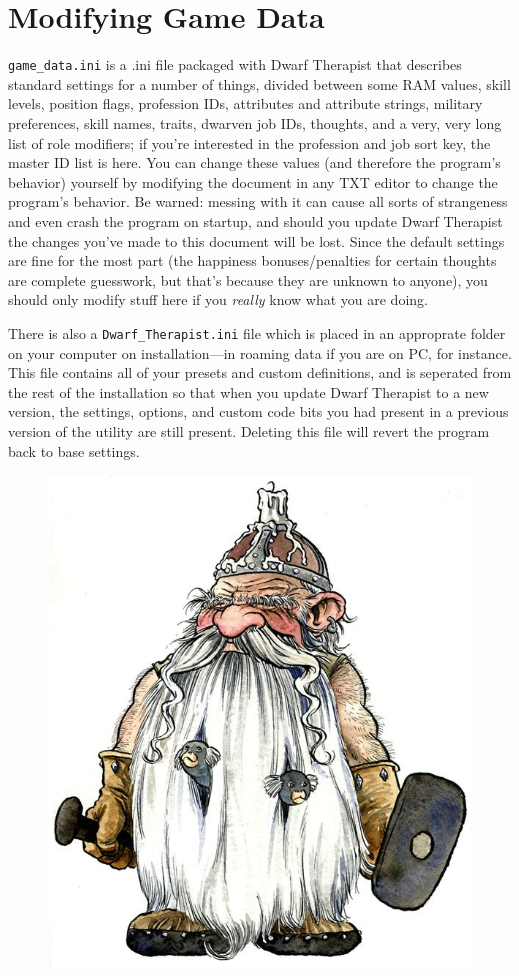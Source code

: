 \documentclass[]{article}
\begin{document}
\section{Modifying Game Data}
\label{sec:Profession IDs}
\label{sec:Game Data}

\texttt{game\_data.ini} is a .ini file packaged with Dwarf Therapist that describes standard settings for
a number of things, divided between some RAM values, skill levels, position flags, profession IDs,
attributes and attribute strings, military preferences, skill names, traits, dwarven job IDs, thoughts,
and a very, very long list of role modifiers; if you're interested in the profession and job
sort key, the master ID list is here. You can change these values (and therefore the program's behavior)
yourself by modifying the document in any TXT editor to change the program's behavior. Be warned:
messing with it can cause all sorts of strangeness and even crash the program on startup, and should you
update Dwarf Therapist the changes you've made to this document will be lost. Since the default settings
are fine for the most part (the happiness bonuses/penalties for certain thoughts are complete guesswork,
but that's because they are unknown to anyone), you should only modify stuff here if you \emph{really}
know what you are doing.

There is also a \texttt{Dwarf\_Therapist.ini} file which is placed in an approprate folder on your
computer on installation---in roaming data if you are on PC, for instance. This file contains all of
your presets and custom definitions, and is seperated from the rest of the installation so that when you
update Dwarf Therapist to a new version, the settings, options, and custom code bits you had present in
a previous version of the utility are still present. Deleting this file will revert the program back to
base settings.

\newpage
{}
\begin{figure}[h!]
\centering
\includegraphics[scale=.5]{Illustration2}
\end{figure}
\end{document}
